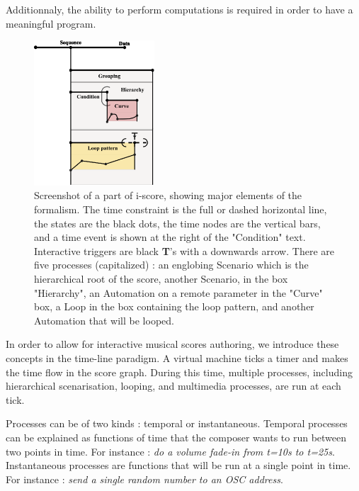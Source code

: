 \documentclass{article}
\begin{document}
Additionnaly, the ability to perform computations is required in order to have a meaningful program.

\begin{figure}
    \centering
    \includegraphics[width=0.40\textwidth]{images/hierarchy.eps}
    \caption{Screenshot of a part of i-score, showing major elements of the formalism. The time constraint is the full or dashed horizontal line, the states are the black dots, the time nodes are the vertical bars, and a time event is shown at the right of the "Condition" text. Interactive triggers are black \textbf{T}'s with a downwards arrow. There are five processes (capitalized) : an englobing Scenario which is the hierarchical root of the score, another Scenario, in the box "Hierarchy", an Automation on a remote parameter in the "Curve" box, a Loop in the box containing the loop pattern, and another Automation that will be looped.}
    \label{fig.hierarchy}
\end{figure}

In order to allow for interactive musical scores authoring, we introduce these concepts in the time-line paradigm.
A virtual machine ticks a timer and makes the time flow in the score graph. 
During this time, multiple processes, including hierarchical scenarisation, looping, and multimedia processes, are 
run at each tick. 

Processes can be of two kinds : temporal or instantaneous.
Temporal processes can be explained as functions of time that the composer wants to run between 
two points in time. 
For instance : \emph{do a volume fade-in from t=10s to t=25s}.~\\
Instantaneous processes are functions that will be run at a single point in time.
For instance : \emph{send a single random number to an OSC address}.
\end{document}
